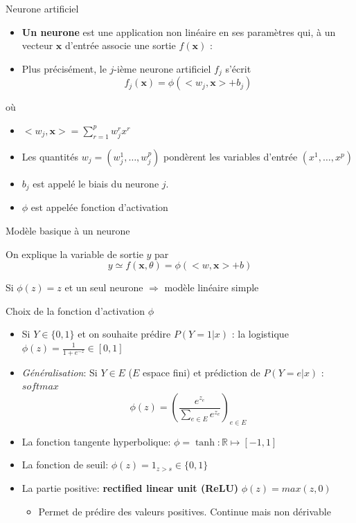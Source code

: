 \documentclass[ignorenonframetext,]{beamer}
\providecommand{\tightlist}{%
  \setlength{\itemsep}{0pt}\setlength{\parskip}{0pt}}
\begin{document}
\begin{frame}{Neurone artificiel}

\begin{itemize}
\item
  \textbf{Un neurone} est une application non linéaire en ses paramètres
  qui, à un vecteur \(\mathbf{x}\) d'entrée associe une sortie
  \(f(\mathbf{x})\) :
\item
  Plus précisément, le \(j\)-ième neurone artificiel \(f_j\) s'écrit
  \[f_j(\mathbf{x}) = \phi(<w_j,\mathbf{x}> + b_j)\]
\end{itemize}

où

\begin{itemize}
\item
  \(<w_j,\mathbf{x}> = \sum_{r=1}^p w_j^r x^r\)
\item
  Les quantités \(w_j = (w_j^1,\dots,w_j^p)\) pondèrent les variables
  d'entrée \((x^1, \dots,x^p)\)
\item
  \(b_j\) est appelé le biais du neurone \(j\).
\item
  \(\phi\) est appelée fonction d'activation
\end{itemize}

\end{frame}

\begin{frame}{Modèle basique à un neurone}

On explique la variable de sortie \(y\) par
\[ y \simeq f(\mathbf{x},\theta) =  \phi(<w,\mathbf{x}> + b)\]

Si \(\phi(z) =z\) et un seul neurone \(\Rightarrow\) modèle linéaire
simple

\end{frame}

\begin{frame}{Choix de la fonction d'activation \(\phi\)}

\begin{itemize}
\item
  Si \(Y \in \{0,1\}\) et on souhaite prédire \(P(Y=1|x)\) : la
  logistique \(\phi(z) = \frac{1}{1+e^{-z}} \in [0,1]\)
\item
  \emph{Généralisation}: Si \(Y \in E\) (\(E\) espace fini) et
  prédiction de \(P(Y= e|x)\) : \(softmax\)
  \[\phi(z) =\left(\frac{e^{z_e}}{\sum_{e \in E} e^{z_e}}\right)_{e \in E}\]
\item
  La fonction tangente hyperbolique:
  \(\phi = \tanh:\mathbb{R} \mapsto [-1,1]\)
\item
  La fonction de seuil: \(\phi(z) = 1_{z>s} \in \{0,1\}\)
\item
  La partie positive: \textbf{rectified linear unit (ReLU)}
  \(\phi(z) = max(z,0)\)

  \begin{itemize}
  \tightlist
  \item
    Permet de prédire des valeurs positives. Continue mais non dérivable
  \end{itemize}
\end{itemize}

\end{frame}
\end{document}
